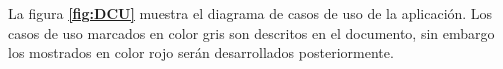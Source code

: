 


La figura \textbf{\ref{fig:DCU}} muestra el diagrama de casos de uso de la aplicación. Los casos de uso marcados en color gris son descritos en el documento, sin embargo los mostrados en color rojo serán desarrollados posteriormente.

